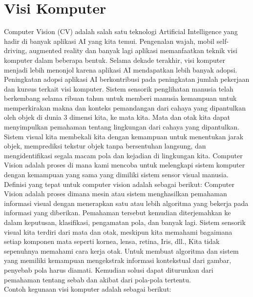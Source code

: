 \section{Visi Komputer}
Computer Vision (CV) adalah salah satu teknologi Artificial Intelligence yang hadir di banyak aplikasi AI yang kita temui. Pengenalan wajah, mobil self-driving, augmented reality dan banyak lagi aplikasi memanfaatkan teknik visi komputer dalam beberapa bentuk. Selama dekade terakhir, visi komputer menjadi lebih menonjol karena aplikasi AI mendapatkan lebih banyak adopsi. Peningkatan adopsi aplikasi AI berkontribusi pada peningkatan jumlah pekerjaan dan kursus terkait visi komputer. Sistem sensorik penglihatan manusia telah berkembang selama ribuan tahun untuk memberi manusia kemampuan untuk memperkirakan makna dan konteks pemandangan dari cahaya yang dipantulkan oleh objek di dunia 3 dimensi kita, ke mata kita. Mata dan otak kita dapat menyimpulkan pemahaman tentang lingkungan dari cahaya yang dipantulkan. Sistem visual kita membekali kita dengan kemampuan untuk menentukan jarak objek, memprediksi tekstur objek tanpa bersentuhan langsung, dan mengidentifikasi segala macam pola dan kejadian di lingkungan kita. Computer Vision adalah proses di mana kami mencoba untuk melengkapi sistem komputer dengan kemampuan yang sama yang dimiliki sistem sensor visual manusia. Definisi yang tepat untuk computer vision adalah sebagai berikut: Computer Vision adalah proses dimana mesin atau sistem menghasilkan pemahaman informasi visual dengan menerapkan satu atau lebih algoritma yang bekerja pada informasi yang diberikan. Pemahaman tersebut kemudian diterjemahkan ke dalam keputusan, klasifikasi, pengamatan pola, dan banyak lagi. Sistem sensorik visual kita terdiri dari mata dan otak, meskipun kita memahami bagaimana setiap komponen mata seperti kornea, lensa, retina, Iris, dll., Kita tidak sepenuhnya memahami cara kerja otak. Untuk membuat algoritma dan sistem yang memiliki kemampuan mengekstrak informasi kontekstual dari gambar, penyebab pola harus diamati. Kemudian solusi dapat diturunkan dari pemahaman tentang sebab dan akibat dari pola-pola tertentu.\citep{ABeginne17}\\
Contoh kegunaan visi komputer adalah sebagai berikut:

